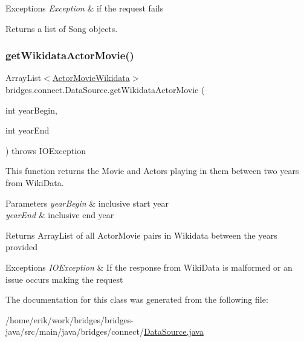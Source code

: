 \begin{DoxyExceptions}{Exceptions}
{\em Exception} & if the request fails\\
\hline
\end{DoxyExceptions}
\begin{DoxyReturn}{Returns}
a list of Song objects. 
\end{DoxyReturn}
\mbox{\label{classbridges_1_1connect_1_1_data_source_a919756dc487ad42a2843d9d9cb71371c}} 
\subsubsection{\texorpdfstring{get\+Wikidata\+Actor\+Movie()}{getWikidataActorMovie()}}
{\footnotesize\ttfamily Array\+List$<$\hyperlink{classbridges_1_1data__src__dependent_1_1_actor_movie_wikidata}{Actor\+Movie\+Wikidata}$>$ bridges.\+connect.\+Data\+Source.\+get\+Wikidata\+Actor\+Movie (\begin{DoxyParamCaption}\item[{int}]{year\+Begin,  }\item[{int}]{year\+End }\end{DoxyParamCaption}) throws I\+O\+Exception}



This function returns the Movie and Actors playing in them between two years from Wiki\+Data. 


\begin{DoxyParams}{Parameters}
{\em year\+Begin} & inclusive start year \\
\hline
{\em year\+End} & inclusive end year \\
\hline
\end{DoxyParams}
\begin{DoxyReturn}{Returns}
Array\+List of all Actor\+Movie pairs in Wikidata between the years provided 
\end{DoxyReturn}

\begin{DoxyExceptions}{Exceptions}
{\em I\+O\+Exception} & If the response from Wiki\+Data is malformed or an issue occurs making the request \\
\hline
\end{DoxyExceptions}


The documentation for this class was generated from the following file\+:\begin{DoxyCompactItemize}
\item 
/home/erik/work/bridges/bridges-\/java/src/main/java/bridges/connect/\hyperlink{_data_source_8java}{Data\+Source.\+java}\end{DoxyCompactItemize}

